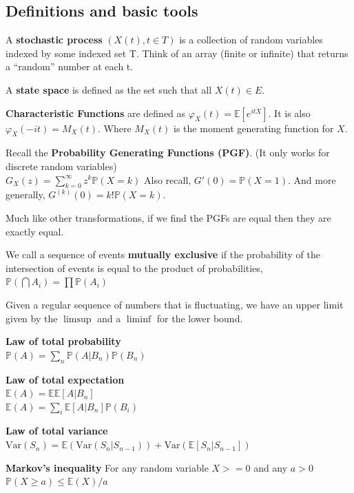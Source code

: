 \documentclass[10pt,landscape,a4paper]{article}
\begin{document}
\small
\begin{multicols*}{4}
\section{Definitions and basic tools}
A \textbf{stochastic process} $(X(t), t \in T)$
is a collection of random variables indexed by
some indexed set T.
Think of an array (finite or infinite) that returns a ``random'' number
at each t.

A \textbf{state space} is defined as the set such that
all $X(t) \in E$.

\textbf{Characteristic Functions} are
defined as $\varphi_X(t) = \mathbb{E}\left[e^{itX}\right]$.
It is also $\varphi_X(-it) = M_X(t)$. Where $M_X(t)$ is the moment generating
function for $X$.

Recall the \textbf{Probability Generating Functions (PGF)}.
(It only works for discrete random variables) \\
$G_X(z) = \sum_{k=0}^\infty z^k \mathbb{P}(X=k)$
Also recall, $G'(0) = \mathbb{P}(X=1)$. And more generally,
$G^{(k)}(0) = k! \mathbb{P}(X=k)$.

Much like other transformations, if we find the PGFs are equal then they
are exactly equal.

We call a sequence of events \textbf{mutually exclusive} if the probability
of the intersection of events is equal to the product of probabilities,
$\mathbb{P}(\bigcap A_i) = \prod \mathbb{P}(A_i)$

Given a regular sequence of numbers that is fluctuating, we have an upper limit
given by the $\limsup$ and a $\liminf$ for the lower bound.

\textbf{Law of total probability} \\
$\mathbb{P}(A) = \sum_n \mathbb{P}(A|B_n) \mathbb{P}(B_n)$

\textbf{Law of total expectation} \\
$\mathbb{E}(A) = \mathbb{E}\mathbb{E}[A|B_n]$ \\
$\mathbb{E}(A) = \sum_i \mathbb{E}[A|B_n]\mathbb{P}(B_i)$

\textbf{Law of total variance} \\
$\text{Var}(S_n) = \mathbb{E}(\text{Var}(S_n | S_{n-1})) + \text{Var}(\mathbb{E}[S_n | S_{n-1}])$

\textbf{Markov's inequality}
For any random variable $X >= 0$ and any $a > 0$ \\
$\mathbb{P}(X \geq a) \leq \mathbb{E}(X)/a$


\end{multicols*}
\end{document}
